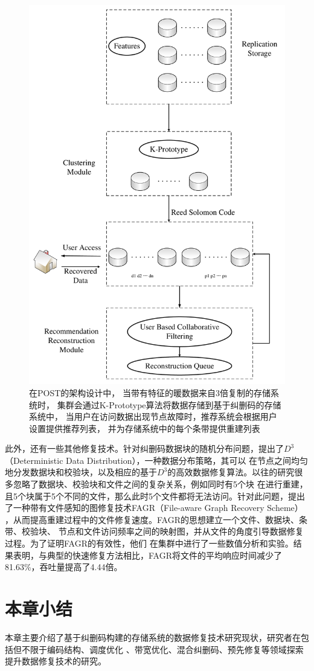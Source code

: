 \begin{figure}[htbp]
	\centering
	\includegraphics [scale=0.25]{figures/2.5.pdf}
	\caption{在POST的架构设计中，
		当带有特征的暖数据来自3倍复制的存储系统时，
		集群会通过K-Prototype算法将数据存储到基于纠删码的存储系统中，
		当用户在访问数据出现节点故障时，推荐系统会根据用户设置提供推荐列表，
		并为存储系统中的每个条带提供重建列表}
	\label{fig:con-2.5}
\end{figure}

此外，还有一些其他修复技术。针对纠删码数据块的随机分布问题，\citet{xu2020deterministic}提出了$D^3$（Deterministic Data Distribution），一种数据分布策略，其可以
在节点之间均匀地分发数据块和校验块，以及相应的基于$D^3$的高效数据修复算法。以往的研究很多忽略了数据块、校验块和文件之间的复杂关系，例如同时有5个块
在进行重建，且5个块属于5个不同的文件，那么此时5个文件都将无法访问。针对此问题，\citet{zeng2020fagr}提出了一种带有文件感知的图修复技术FAGR（File-aware Graph Recovery Scheme）
，从而提高重建过程中的文件修复速度。FAGR的思想建立一个文件、数据块、条带、校验块、
节点和文件访问频率之间的映射图，并从文件的角度引导数据修复过程。为了证明FAGR的有效性，他们
在集群中进行了一些数值分析和实验。结果表明，与典型的快速修复方法相比，FAGR将文件的平均响应时间减少了81.63\%，吞吐量提高了4.44倍。


\section{本章小结}
本章主要介绍了基于纠删码构建的存储系统的数据修复技术研究现状，研究者在包括但不限于编码结构、调度优化
、带宽优化、混合纠删码、预先修复等领域探索提升数据修复技术的研究。